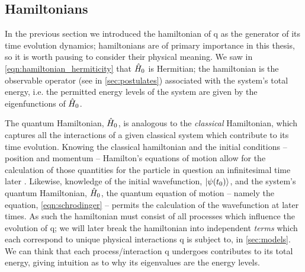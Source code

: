 \subsection{Hamiltonians}\label{sec:hamiltonians}
In the previous section we introduced the \gls{hamiltonian} of \gls{q} as the generator of its 
    time evolution dynamics;
    \glspl{hamiltonian} are of primary importance in this thesis, so it is worth pausing to consider their physical meaning. 
We saw in \cref{eqn:hamiltonian_hermiticity} that $\hat{H}_0$ is Hermitian;
    the \gls{hamiltonian} is the observable operator (see  in \cref{sec:postulates}) 
    associated with the system's total energy, 
    i.e. the permitted energy levels of the system are given by the eigenfunctions of $\hat{H}_0$. 
\par 

The quantum Hamiltonian, $\hat{H}_0$, is analogous to the \emph{classical} Hamiltonian, 
    which captures all the interactions of a given classical system which contribute to its time evolution.
Knowing the classical \gls{hamiltonian} and the initial conditions -- position and momentum -- 
    Hamilton's equations of motion allow for the calculation of those quantities for the particle 
    in question an infinitesimal time later \cite{susskind2014classical}.    
Likewise, knowledge of the initial wavefunction, $\ket{\psi(t_0)}$, and the system's quantum Hamiltonian, $\hat{H}_0$, 
    the quantum equation of motion -- namely the \schrodinger equation, \cref{eqn:schrodinger} -- 
    permits the calculation of the wavefunction at later times.
As such the \gls{hamiltonian} must consist of all processes which influence the evolution of \gls{q};
    we will later break the \gls{hamiltonian} into independent \emph{terms} which each correspond to unique physical interactions
    \gls{q} is subject to, in \cref{sec:models}. 
We can think that each process/interaction \gls{q} undergoes contributes to its total energy,
    giving intuition as to why its eigenvalues are the energy levels. 
\par 
{}


